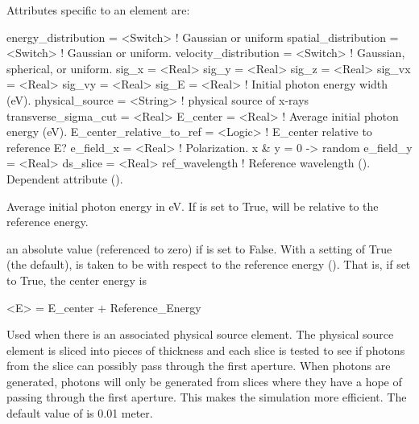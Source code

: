 {
Attributes specific to an  element are:
\begin{example}
  energy_distribution      = <Switch>  ! Gaussian or uniform
  spatial_distribution     = <Switch>  ! Gaussian or uniform. 
  velocity_distribution    = <Switch>  ! Gaussian, spherical, or uniform. 
  sig_x                    = <Real>
  sig_y                    = <Real>
  sig_z                    = <Real>
  sig_vx                   = <Real>
  sig_vy                   = <Real>
  sig_E                    = <Real>    ! Initial photon energy width (eV).
  physical_source          = <String>  ! physical source of x-rays
  transverse_sigma_cut     = <Real>
  E_center                 = <Real>    ! Average initial photon energy (eV).
  E_center_relative_to_ref = <Logic>   ! E_center relative to reference E?
  e_field_x                = <Real>    ! Polarization. x & y = 0 -> random
  e_field_y                = <Real>
  ds_slice                 = <Real>
  ref_wavelength    ! Reference wavelength (). Dependent attribute ().
\end{example}

  \begin{description}
  \item[\vn{E_center}] \Newline
Average initial photon energy in eV. If 
is set to True,  will be relative to the reference
energy.

  \item[\vn{E_center_relative_to_ref}] \Newline
{} an absolute value (referenced to zero) if
 is set to False. With a setting of True
(the default),  is taken to be with respect to the
reference energy (). That is, if set to True, the
center energy  is
\begin{example}
  <E> = E_center + Reference_Energy
\end{example}

  \item[\vn{ds_slice}] \Newline
Used when there is an associated physical source element. The physical
source element is sliced into pieces of thickness  and
each slice is tested to see if photons from the slice can possibly
pass through the first aperture. When photons are generated, photons
will only be generated from slices where they have a hope of passing
through the first aperture. This makes the simulation more efficient.
The default value of  is 0.01 meter.


\end{description}}
